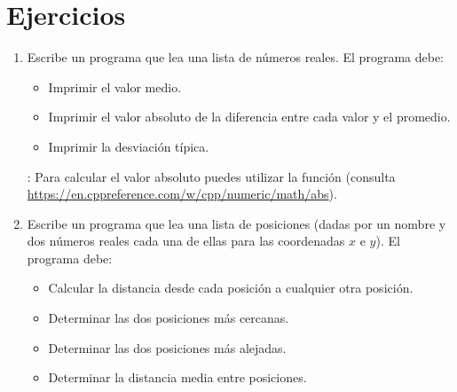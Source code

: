 \section{Ejercicios}

\begin{enumerate}

\item Escribe un programa que lea una lista de números reales. El programa debe:
\begin{itemize}
  \item Imprimir el valor medio.
  \item Imprimir el valor absoluto de la diferencia entre cada valor y el promedio.
  \item Imprimir la desviación típica.
\end{itemize}

: Para calcular el valor absoluto puedes utilizar la función
 (consulta
\url{https://en.cppreference.com/w/cpp/numeric/math/abs}).

\item Escribe un programa que lea una lista de posiciones (dadas por un nombre y 
      dos números reales cada una de ellas para las coordenadas $x$ e $y$). 
      El programa debe:
\begin{itemize}
  \item Calcular la distancia desde cada posición a cualquier otra posición.
  \item Determinar las dos posiciones más cercanas.
  \item Determinar las dos posiciones más alejadas.
  \item Determinar la distancia media entre posiciones.
\end{itemize}

\end{enumerate}
